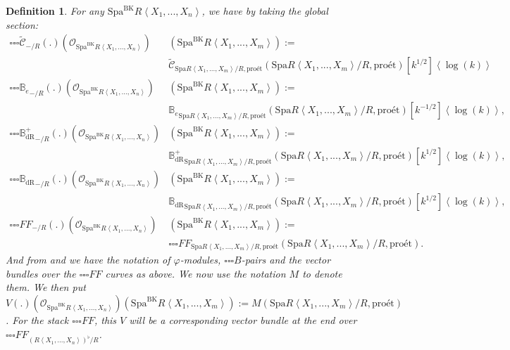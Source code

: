 \documentclass[12pt]{book}
\newtheorem{definition}{Definition}
\begin{document}
\begin{definition}
For any $\mathrm{Spa}^\mathrm{BK}R\left<X_1,...,X_n\right>$, we have by taking the global section:
\begin{align}
{\square\square\square}\widetilde{\mathcal{C}}_{-/R}(.)(\mathcal{O}_{\mathrm{Spa}^\mathrm{BK}R\left<X_1,...,X_n\right>})&(\mathrm{Spa}^\mathrm{BK}R\left<X_1,...,X_m\right>):=\\
&\widetilde{\mathcal{C}}_{\mathrm{Spa}R\left<X_1,...,X_m\right>/R,\text{pro\'et}}(\mathrm{Spa}R\left<X_1,...,X_m\right>/R,\text{pro\'et})[k^{1/2}]\left<\log(k)\right>\\
{\square\square\square}{\mathbb{B}_e}_{-/R}(.)(\mathcal{O}_{\mathrm{Spa}^\mathrm{BK}R\left<X_1,...,X_n\right>})&(\mathrm{Spa}^\mathrm{BK}R\left<X_1,...,X_m\right>):=\\
&{\mathbb{B}_e}_{\mathrm{Spa}R\left<X_1,...,X_m\right>/R,\text{pro\'et}}(\mathrm{Spa}R\left<X_1,...,X_m\right>/R,\text{pro\'et})[k^{-1/2}]\left<\log(k)\right>,\\
{\square\square\square}{\mathbb{B}_\mathrm{dR}^+}_{-/R}(.)(\mathcal{O}_{\mathrm{Spa}^\mathrm{BK}R\left<X_1,...,X_n\right>})&(\mathrm{Spa}^\mathrm{BK}R\left<X_1,...,X_m\right>):=\\
&{\mathbb{B}_\mathrm{dR}^+}_{\mathrm{Spa}R\left<X_1,...,X_m\right>/R,\text{pro\'et}}(\mathrm{Spa}R\left<X_1,...,X_m\right>/R,\text{pro\'et})[k^{1/2}]\left<\log(k)\right>,\\
{\square\square\square}{\mathbb{B}_\mathrm{dR}}_{-/R}(.)(\mathcal{O}_{\mathrm{Spa}^\mathrm{BK}R\left<X_1,...,X_n\right>})&(\mathrm{Spa}^\mathrm{BK}R\left<X_1,...,X_m\right>):=\\
&{\mathbb{B}_\mathrm{dR}}_{\mathrm{Spa}R\left<X_1,...,X_m\right>/R,\text{pro\'et}}(\mathrm{Spa}R\left<X_1,...,X_m\right>/R,\text{pro\'et})[k^{1/2}]\left<\log(k)\right>,\\
{\square\square\square}{{FF}}_{-/R}(.)(\mathcal{O}_{\mathrm{Spa}^\mathrm{BK}R\left<X_1,...,X_n\right>})&(\mathrm{Spa}^\mathrm{BK}R\left<X_1,...,X_m\right>):=\\
&{\square\square\square}{FF}_{\mathrm{Spa}R\left<X_1,...,X_m\right>/R,\text{pro\'et}}(\mathrm{Spa}R\left<X_1,...,X_m\right>/R,\text{pro\'et}).
\end{align}
And from \cite[Definition 9.3.3, Definition 9.3.5, Definition 9.3.11, Definition 9.3.9]{KL1} and \cite{KL2} we have the notation of $\varphi$-modules, ${\square\square\square}B$-pairs and the vector bundles over the ${\square\square\square}FF$ curves as above. We now use the notation $M$ to denote them. We then put $V(.)(\mathcal{O}_{\mathrm{Spa}^\mathrm{BK}R\left<X_1,...,X_n\right>})(\mathrm{Spa}^\mathrm{BK}R\left<X_1,...,X_m\right>):=M(\mathrm{Spa}R\left<X_1,...,X_m\right>/R,\text{pro\'et})$. For the stack ${\square\square\square}FF$, this $V$ will be a corresponding vector bundle at the end over ${\square\square\square}FF_{(R\left<X_1,...,X_n\right>)^\flat/R}$. 	
\end{definition}
  
\end{document}
